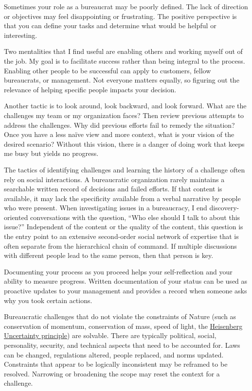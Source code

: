 Sometimes your role as a bureaucrat may be poorly defined. The lack of direction or objectives may feel disappointing or frustrating. The positive perspective is that you can define your tasks and determine what would be helpful or interesting. 

Two mentalities that I find useful are enabling others and working myself out of the job. My goal is to facilitate success rather than being integral to the process. Enabling other people to be successful can apply to customers, fellow bureaucrats, or management. Not everyone matters equally, so figuring out the relevance of helping specific people impacts your decision. 

Another tactic is to look around, look backward, and look forward. What are the challenges my team or my organization faces? Then review previous attempts to address the challenges. Why did previous efforts fail to remedy the situation? Once you have a less na\"ive view and more context, what is your vision of the desired scenario? Without this vision, there is a danger of doing work that keeps me busy but yields no progress. 

The tactics of identifying challenges and learning the history of a challenge often rely on social interactions. A bureaucratic organization rarely maintains a searchable written record of decisions and failed efforts. If that content is available, it may lack the specificity available from a verbal narrative by people who were present. When investigating issues in a bureaucracy, I end discovery-oriented conversations with the question, ``Who else should I talk to about this issue?'' Independent of the content or the quality of the content, this question is the entry point to an extensive second-order social network of expertise that is often separate from the hierarchical chain of command. If multiple  discussions with different people lead to the same person, then that person is key. 

Documenting your process as you proceed helps  your self-reflection and your ability to measure progress. Written documentation of your status can be used as proactive updates to your management and provides a record when someone asks  why you took certain actions.

Bureaucratic challenges that do not violate the constraints of Nature (such as conservation of momentum, conservation of mass, speed of light, the \href{https://en.wikipedia.org/wiki/Uncertainty_principle}{Heisenberg Uncertainty principle}) 
are solvable. There are typically political, social, personality, security, and technical aspects that need to be accounted for. Laws can be changed, regulations altered, people replaced, and norms updated. Constraints that appear to be logically inconsistent may be reframed to be resolved. Narrowing or broadening the scope may reset the context for a challenge.



